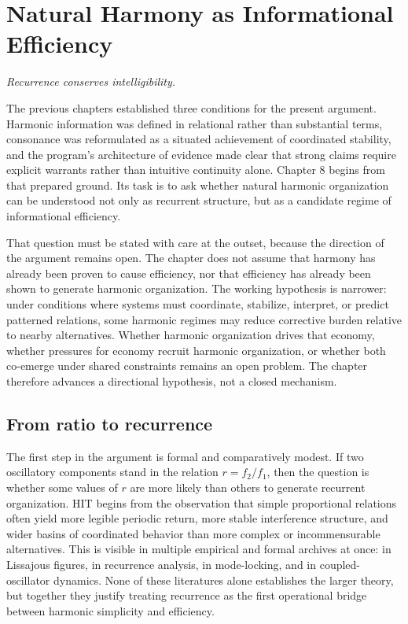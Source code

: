 \chapter{Natural Harmony as Informational Efficiency}

\epigraph{\emph{Recurrence conserves intelligibility.}}{}

The previous chapters established three conditions for the present argument. Harmonic information was defined in relational rather than substantial terms, consonance was reformulated as a situated achievement of coordinated stability, and the program's architecture of evidence made clear that strong claims require explicit warrants rather than intuitive continuity alone. Chapter 8 begins from that prepared ground. Its task is to ask whether natural harmonic organization can be understood not only as recurrent structure, but as a candidate regime of informational efficiency.

That question must be stated with care at the outset, because the direction of the argument remains open. The chapter does not assume that harmony has already been proven to cause efficiency, nor that efficiency has already been shown to generate harmonic organization. The working hypothesis is narrower: under conditions where systems must coordinate, stabilize, interpret, or predict patterned relations, some harmonic regimes may reduce corrective burden relative to nearby alternatives. Whether harmonic organization drives that economy, whether pressures for economy recruit harmonic organization, or whether both co-emerge under shared constraints remains an open problem. The chapter therefore advances a directional hypothesis, not a closed mechanism.

\section{From ratio to recurrence}

The first step in the argument is formal and comparatively modest. If two oscillatory components stand in the relation $r = f_2 / f_1$, then the question is whether some values of $r$ are more likely than others to generate recurrent organization. HIT begins from the observation that simple proportional relations often yield more legible periodic return, more stable interference structure, and wider basins of coordinated behavior than more complex or incommensurable alternatives. This is visible in multiple empirical and formal archives at once: in Lissajous figures, in recurrence analysis, in mode-locking, and in coupled-oscillator dynamics. None of these literatures alone establishes the larger theory, but together they justify treating recurrence as the first operational bridge between harmonic simplicity and efficiency.

